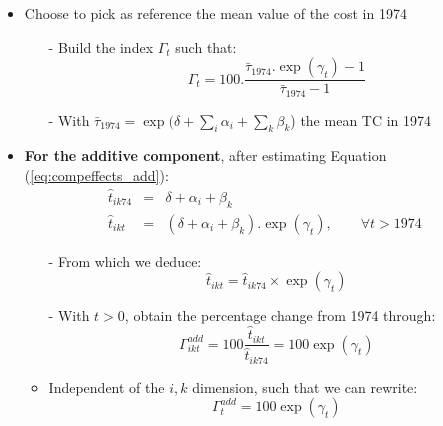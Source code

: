 \documentclass[10 pt,Helvetica, french]{beamer}
\begin{document}
\begin{frame}
\begin{itemize}
\item Choose to pick as reference the mean value of the cost in 1974
\begin{itemize}
\item[-] Build the index $\Gamma_t$ such that:
\footnotesize
\begin{equation*}
 \Gamma_t= 100.\frac {\bar{\tau}_{1974}.\exp(\gamma_t)-1} {\bar{\tau}_{1974}-1}
\end{equation*}
\item[-] With $\bar{\tau}_{1974} = \exp(\delta + \sum_i \alpha_i + \sum_k \beta_k$) the mean TC in 1974 \vspace{0.2cm}
\end{itemize}
\item \textbf{For the additive component}, after estimating Equation (\ref{eq:compeffects_add}):
\footnotesize
\begin{eqnarray*}
\widehat{t}_{ik74}&= & \delta + \alpha_i+ \beta_k \\
\widehat{t}_{ikt}&=&\left(\delta + \alpha_i+ \beta_k\right).\exp(\gamma_t),\qquad \forall t > 1974
\end{eqnarray*}
\normalsize

\begin{itemize}
\item[-] From which we deduce:
$$\widehat{t}_{ikt} = \widehat{t}_{ik74} \times \exp(\gamma_t)$$
\item[-] With $t >0$, obtain the percentage change from 1974 through:
\footnotesize
\begin{equation*}
\Gamma^{add}_{ikt} = 100\frac{\widehat{t}_{ikt}}{\widehat{t}_{ik74}} = 100\exp(\gamma_t)
\end{equation*}
\normalsize
\item Independent of the $i,k$ dimension, such that we can rewrite:
$$\Gamma^{add}_t  = 100\exp(\gamma_t) $$
\end{itemize}
\end{itemize}
\hyperlink{slide_compeffects}{}
\end{frame}
\end{document}
